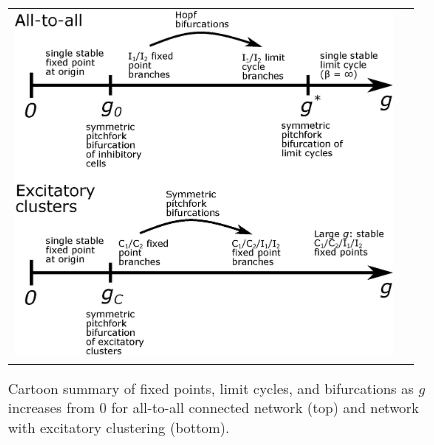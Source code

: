 \documentclass[reqno]{siamonline190516}
\begin{document}
\begin{figure}
    \centering
    \begin{tabular}{cc}
    \includegraphics[width=10cm]{bdsummary.eps}
    \end{tabular}
    \caption{Cartoon summary of fixed points, limit cycles, and bifurcations as $g$ increases from 0 for all-to-all connected network (top) and network with excitatory clustering (bottom).} 
    \label{fig:bdsummary}
\end{figure}
\end{document}
